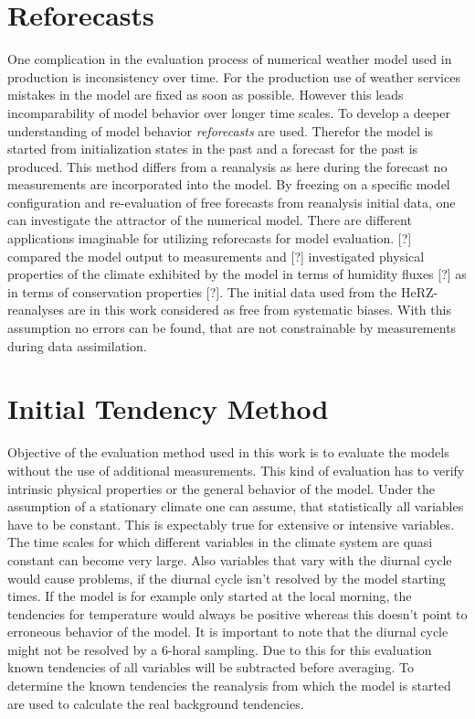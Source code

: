 \section{Reforecasts}
\p
One complication in the evaluation process of numerical weather model used in production is inconsistency over time. For the production use of weather services mistakes in the model are fixed as soon as possible. However this leads incomparability of model behavior over longer time scales.
\p
To develop a deeper understanding of model behavior \emph{reforecasts} are used. Therefor the model is started from initialization states in the past and a forecast for the past is produced. This method differs from a reanalysis as here during the forecast no measurements are incorporated into the model.
\p
By freezing on a specific model configuration and re-evaluation of free forecasts from reanalysis initial data, one can investigate the attractor of the numerical model.
\p
There are different applications imaginable for utilizing reforecasts for model evaluation. [?] compared the model output to measurements and [?] investigated physical properties of the climate exhibited by the model in terms of humidity fluxes [?] as in terms of conservation properties [?].
\p
The initial data used from the HeRZ-reanalyses are in this work considered as free from systematic biases. With this assumption no errors can be found, that are not constrainable by measurements during data assimilation. 
\pagebreak
\section{Initial Tendency Method}
\p
Objective of the evaluation method used in this work is to evaluate the models without the use of additional measurements. This kind of evaluation has to verify intrinsic physical properties or the general behavior of the model.
\p
Under the assumption of a stationary climate one can assume, that statistically all variables have to be constant. This is expectably true for extensive or intensive variables.
\p
The time scales for which different variables in the climate system are quasi constant can become very large. Also variables that vary with the diurnal cycle would cause problems, if the diurnal cycle isn't resolved by the model starting times. If the model is for example only started at the local morning, the tendencies for temperature would always be positive whereas this doesn't point to erroneous behavior of the model. It is important to note that the diurnal cycle might not be resolved by a 6-horal sampling.
\p
Due to this for this evaluation known tendencies of all variables will be subtracted before averaging. To determine the known tendencies the reanalysis from which the model is started are used to calculate the real background tendencies.
\p

